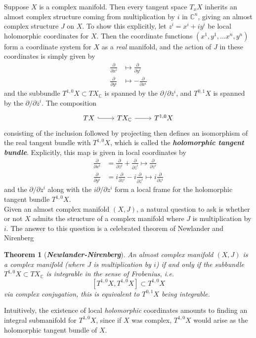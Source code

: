 \documentclass[psamsfonts, 12pt]{amsart}
\newtheorem{thm}{Theorem}[section]
\theoremstyle{definition}
\theoremstyle{remark}
\newcommand{\ib}[1]{\textbf{\textit{#1}}}
\newcommand{\C}{\mathbb{C}}
\begin{document}
Suppose $X$ is a complex manifold. Then every tangent space $T_xX$ inherits an almost
complex structure coming from multiplication by $i$ in $\C^n$, giving an almost complex
structure $J$ on $X$. To show this explicitly, let $z^i = x^i + iy^i$ be local
holomorphic coordinates for $X$. Then the coordinate functions
$(x^1, y^1, \ldots x^n, y^n)$ form a coordinate system for $X$ as a \emph{real} manifold,
and the action of $J$ in these coordinates is simply given by
%
\begin{align*}
\frac{\partial}{\partial x^i} &\mapsto \frac{\partial}{\partial y^i} \\
\frac{\partial}{\partial y^i} &\mapsto -\frac{\partial}{\partial x^i}
\end{align*}
%
and the subbundle $T^{1,0}X \subset TX_\C$ is spanned by the $\partial/\partial z^i$,
and $T^{0,1}X$ is spanned by the $\partial/\partial\overline{z}^i$. The composition
\[\begin{tikzcd}
TX \ar[r,hookrightarrow] & TX_\C \ar[r] & T^{1,0}X
\end{tikzcd}\]
consisting of the inclusion followed by projecting then defines an isomorphism of
the real tangent bundle with $T^{1,0}X$, which is called the
\ib{holomorphic tangent bundle}. Explicitly, this map is given in local coordinates by
%
\begin{align*}
\frac{\partial}{\partial x^i} &=
\frac{\partial}{\partial z^i} + \frac{\partial}{\partial\overline{z}^i}
\mapsto \frac{\partial}{\partial z^i} \\
\frac{\partial}{\partial y^i} &=
i\frac{\partial}{\partial z^i} - i\frac{\partial}{\partial\overline{z}^i}
\mapsto i\frac{\partial}{\partial z^i}
\end{align*}
%
and the $\partial/\partial z^i$ along with the $i\partial/\partial z^i$ form a local
frame for the holomorphic tangent bundle $T^{1,0}X$.\\

Given an almost complex manifold $(X,J)$, a natural question to ask is whether or not
$X$ admits the structure of a complex manifold where $J$ is multiplication by $i$.
The answer to this question is a celebrated theorem of Newlander and Nirenberg
%
\begin{thm}[\ib{Newlander-Nirenberg}]
An almost complex manifold $(X,J)$ is a complex manifold (where $J$ is multiplication by
$i$) if and only if the subbundle $T^{1,0}X \subset TX_\C$ is integrable in the sense
of Frobenius, i.e.
\[
[T^{1,0}X, T^{1,0}X] \subset T^{1,0}X
\]
via complex conjugation, this is equivalent to $T^{0,1}X$ being integrable.
\end{thm}
%
Intuitively, the existence of local \emph{holomorphic} coordinates amounts to
finding an integral submanifold for $T^{1,0}X$, since if $X$ was complex, $T^{1,0}X$
would arise as the holomorphic tangent bundle of $X$.
%
\end{document}

